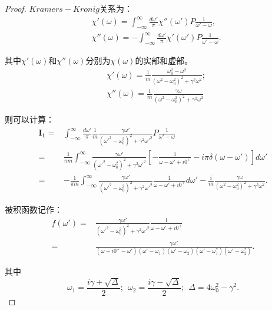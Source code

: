 \documentclass[reqno,a4paper,12pt]{amsart}
\begin{document}
\begin{proof}
$Kramers-Kronig$关系为：
\begin{align*}
	&\chi'(\omega) = \int_{-\infty}^\infty \frac{d\omega'}{\pi} \chi''(\omega') P\frac{1}{\omega'-\omega}, \\
	&\chi''(\omega) = -\int_{-\infty}^{\infty} \frac{d\omega'}{\pi} \chi'(\omega') P \frac{1}{\omega'-\omega}.
\end{align*}

其中$\chi'(\omega)$和$\chi''(\omega)$分别为$\chi(\omega)$的实部和虚部。
\begin{align*}
	&\chi'(\omega) = \frac{1}{m} \frac{\omega_0^2 - \omega^2}{(\omega^2-\omega_0^2)^2 + \gamma^2\omega^2}; \\
	&\chi''(\omega) = \frac{1}{m} \frac{\gamma \omega}{(\omega^2-\omega_0^2)^2 + \gamma^2\omega^2}
\end{align*}

则可以计算：
\begin{align*}
	\mathbf{I_1} = &\int_{-\infty}^{\infty} \frac{d\omega'}{\pi} \frac{1}{m} \frac{\gamma\omega'}{(\omega'^2-\omega_0^2)^2 + \gamma^2\omega'^2} P \frac{1}{\omega'-\omega} \\
	=& \frac{1}{\pi m} \int_{-\infty}^{\infty} \frac{\gamma\omega'}{(\omega'^2-\omega_0^2)^2 + \gamma^2\omega'^2} \left[ -\frac{1}{\omega-\omega'+i0^+} - i\pi\delta(\omega-\omega') \right] d\omega' \\
	=& - \frac{1}{\pi m} \int_{-\infty}^{\infty} \frac{\gamma\omega'}{(\omega'^2-\omega_0^2)^2 + \gamma^2\omega'^2} \frac{1}{\omega-\omega'+i0^+} d\omega' - \frac{i}{m}\frac{\gamma\omega}{(\omega^2-\omega_0^2)^2 + \gamma^2\omega^2}.
\end{align*}

被积函数记作：
\begin{align*}
	f(\omega') =& \frac{\gamma\omega'}{(\omega'^2-\omega_0^2)^2 + \gamma^2\omega'^2} \frac{1}{\omega-\omega'+i0^+} \\
	=& \frac{\gamma\omega'}{(\omega+i0^+-\omega')(\omega'-\omega_1)(\omega'-\omega_2)(\omega'-\omega_1^*)(\omega'-\omega_2^*)}.
\end{align*}

其中
\[
	\omega_1 = \frac{i\gamma+\sqrt{\Delta}}{2}; \ \ \omega_2 = \frac{i\gamma-\sqrt{\Delta}}{2}; \ \ \Delta = 4\omega_0^2-\gamma^2.
\]


\end{proof}
\end{document}
